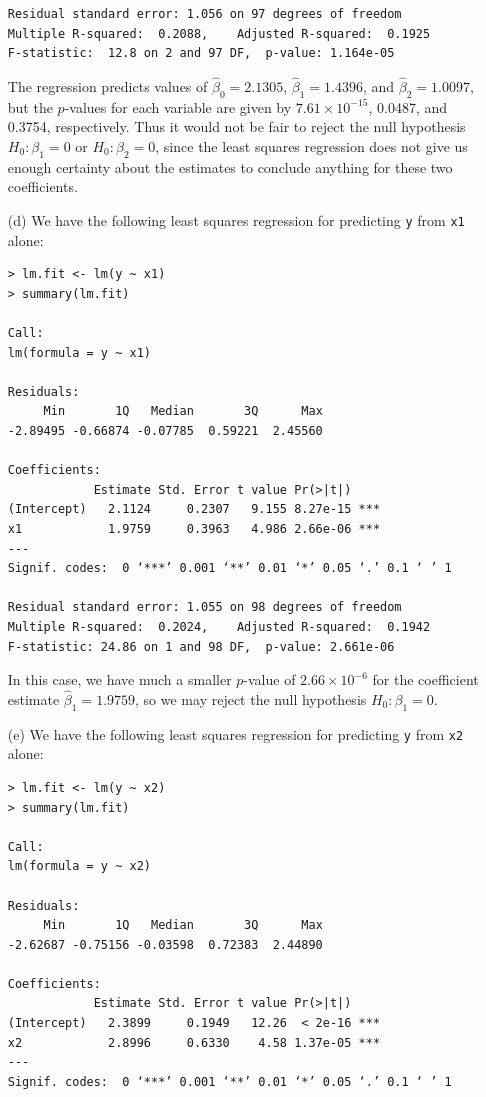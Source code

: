 \begin{itemize}
\begin{lstlisting}
Residual standard error: 1.056 on 97 degrees of freedom
Multiple R-squared:  0.2088,    Adjusted R-squared:  0.1925
F-statistic:  12.8 on 2 and 97 DF,  p-value: 1.164e-05
        \end{lstlisting}
        The regression predicts values of $\hat{\beta}_0 = 2.1305$,
        $\hat{\beta}_1 = 1.4396$, and $\hat{\beta}_2 = 1.0097$, but the
        $p$-values for
        each variable are given by $7.61\times {10}^{-15}$, 0.0487, and 0.3754,
        respectively. Thus it would not be fair to reject the null hypothesis
        $H_0 : \beta_1 = 0$ or $H_0 : \beta_2 = 0$, since the least
        squares regression
        does not give us enough certainty about the estimates to conclude
        anything for
        these two coefficients.
    \item[(d)] We have the following least squares regression for
        predicting \verb|y|
        from \verb|x1| alone:
        \begin{lstlisting}
> lm.fit <- lm(y ~ x1)
> summary(lm.fit)

Call:
lm(formula = y ~ x1)

Residuals:
     Min       1Q   Median       3Q      Max
-2.89495 -0.66874 -0.07785  0.59221  2.45560

Coefficients:
            Estimate Std. Error t value Pr(>|t|)
(Intercept)   2.1124     0.2307   9.155 8.27e-15 ***
x1            1.9759     0.3963   4.986 2.66e-06 ***
---
Signif. codes:  0 ‘***’ 0.001 ‘**’ 0.01 ‘*’ 0.05 ‘.’ 0.1 ‘ ’ 1

Residual standard error: 1.055 on 98 degrees of freedom
Multiple R-squared:  0.2024,    Adjusted R-squared:  0.1942
F-statistic: 24.86 on 1 and 98 DF,  p-value: 2.661e-06
        \end{lstlisting}
        In this case, we have much a smaller $p$-value of $2.66 \times {10}^{-6}$
        for the coefficient estimate $\hat{\beta}_1 = 1.9759$, so we may reject the
        null hypothesis $H_0 : \beta_1 = 0$.
    \item[(e)]We have the following least squares regression for
        predicting \verb|y|
        from \verb|x2| alone:
        \begin{lstlisting}
> lm.fit <- lm(y ~ x2)
> summary(lm.fit)

Call:
lm(formula = y ~ x2)

Residuals:
     Min       1Q   Median       3Q      Max
-2.62687 -0.75156 -0.03598  0.72383  2.44890

Coefficients:
            Estimate Std. Error t value Pr(>|t|)
(Intercept)   2.3899     0.1949   12.26  < 2e-16 ***
x2            2.8996     0.6330    4.58 1.37e-05 ***
---
Signif. codes:  0 ‘***’ 0.001 ‘**’ 0.01 ‘*’ 0.05 ‘.’ 0.1 ‘ ’ 1


\end{lstlisting}
\end{itemize}
